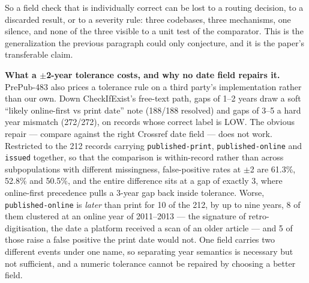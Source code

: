 \documentclass[letterpaper]{article} %
\begin{document}
So a field check that is individually correct can be lost to a routing
decision, to a discarded result, or to a severity rule: three codebases, three
mechanisms, one silence, and none of the three visible to a unit test of the
comparator. This is the generalization the previous paragraph could only
conjecture, and it is the paper's transferable claim.

\noindent\textbf{What a $\pm$2-year tolerance costs, and why no date field
repairs it.} PrePub-483 also prices a tolerance rule on a third party's
implementation rather than our own. Down CheckIfExist's free-text path, gaps of
1--2 years draw a soft ``likely online-first vs print date'' note (188/188
resolved) and gaps of 3--5 a hard year mismatch (272/272), on records whose
correct label is LOW. The obvious repair --- compare against the right Crossref
date field --- does not work. Restricted to the 212 records carrying
\texttt{published-print}, \texttt{published-online} and \texttt{issued} together,
so that the comparison is within-record rather than across subpopulations with
different missingness, false-positive rates at $\pm$2 are 61.3\%, 52.8\% and
50.5\%, and the entire difference sits at a gap of exactly 3, where
online-first precedence pulls a 3-year gap back inside tolerance. Worse,
\texttt{published-online} is \emph{later} than print for 10 of the 212, by up to
nine years, 8 of them clustered at an online year of 2011--2013 --- the
signature of retro-digitisation, the date a platform received a scan of an older
article --- and 5 of those raise a false positive the print date would not. One
field carries two different events under one name, so separating year semantics
is necessary but not sufficient, and a numeric tolerance cannot be repaired by
choosing a better field.
\end{document}
